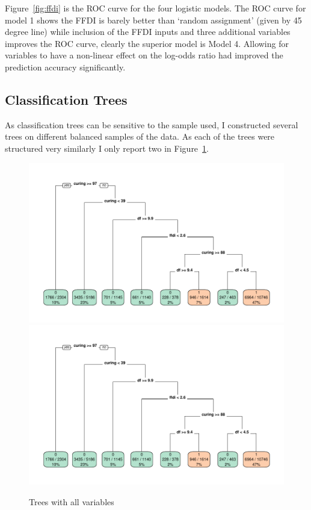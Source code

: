 \documentclass[11pt,a4paper]{article}
\begin{document}
Figure~\ref{fig:ffdi} is the ROC curve for the four logistic models. The ROC curve for model 1 shows the FFDI is barely better than `random assignment' (given by 45 degree line) while inclusion of the FFDI inputs and three additional variables improves the ROC curve, clearly the superior model is Model 4. Allowing for variables to have a non-linear effect on the log-odds ratio had improved the prediction accuracy significantly.



\subsection{Classification Trees}

As classification trees can be sensitive to the sample used, I constructed several trees on different balanced samples of the data. As each of the trees were structured very similarly I only report two in Figure~\ref{fig:tree2}.

\begin{figure}
  \centering
	\includegraphics[page=1, width=1\columnwidth]{figures/trees2.pdf}
	\includegraphics[page=2, width=1\columnwidth]{figures/trees2.pdf}
  \caption{Trees with all variables}
  \label{fig:tree2}
\end{figure}
\end{document}
